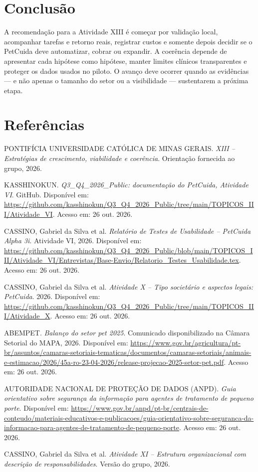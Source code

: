 \documentclass[12pt,a4paper]{article}
\begin{document}
\section{Conclusão}

A recomendação para a Atividade XIII é começar por validação local, acompanhar tarefas e retorno reais, registrar custos e somente depois decidir se o PetCuida deve automatizar, cobrar ou expandir. A coerência depende de apresentar cada hipótese como hipótese, manter limites clínicos transparentes e proteger os dados usados no piloto. O avanço deve ocorrer quando as evidências — e não apenas o tamanho do setor ou a visibilidade — sustentarem a próxima etapa.

\section*{Referências}
\small
\begin{enumerate}[label={[\arabic*]},leftmargin=1.3cm,itemsep=0.25em]
\item PONTIFÍCIA UNIVERSIDADE CATÓLICA DE MINAS GERAIS. \textit{XIII -- Estratégias de crescimento, viabilidade e coerência}. Orientação fornecida ao grupo, 2026.
\item KASSHINOKUN. \textit{Q3\_Q4\_2026\_Public: documentação do PetCuida, Atividade VI}. GitHub. Disponível em: \url{https://github.com/kasshinokun/Q3_Q4_2026_Public/tree/main/TOPICOS_III/Atividade_VI}. Acesso em: 26 out. 2026.
\item CASSINO, Gabriel da Silva et al. \textit{Relatório de Testes de Usabilidade -- PetCuida Alpha 3i}. Atividade VI, 2026. Disponível em: \url{https://github.com/kasshinokun/Q3_Q4_2026_Public/blob/main/TOPICOS_III/Atividade_VI/Entrevistas/Base-Envio/Relatorio_Testes_Usabilidade.tex}. Acesso em: 26 out. 2026.
\item CASSINO, Gabriel da Silva et al. \textit{Atividade X -- Tipo societário e aspectos legais: PetCuida}. 2026. Disponível em: \url{https://github.com/kasshinokun/Q3_Q4_2026_Public/tree/main/TOPICOS_III/Atividade_X}. Acesso em: 26 out. 2026.
\item ABEMPET. \textit{Balanço do setor pet 2025}. Comunicado disponibilizado na Câmara Setorial do MAPA, 2026. Disponível em: \url{https://www.gov.br/agricultura/pt-br/assuntos/camaras-setoriais-tematicas/documentos/camaras-setoriais/animais-e-estimacao/2026/45a-ro-23-04-2026/release-projecao-2025-setor-pet.pdf}. Acesso em: 26 out. 2026.
\item AUTORIDADE NACIONAL DE PROTEÇÃO DE DADOS (ANPD). \textit{Guia orientativo sobre segurança da informação para agentes de tratamento de pequeno porte}. Disponível em: \url{https://www.gov.br/anpd/pt-br/centrais-de-conteudo/materiais-educativos-e-publicacoes/guia-orientativo-sobre-seguranca-da-informacao-para-agentes-de-tratamento-de-pequeno-porte}. Acesso em: 26 out. 2026.
\item CASSINO, Gabriel da Silva et al. \textit{Atividade XI -- Estrutura organizacional com descrição de responsabilidades}. Versão do grupo, 2026.
\end{enumerate}
\normalsize
\end{document}

